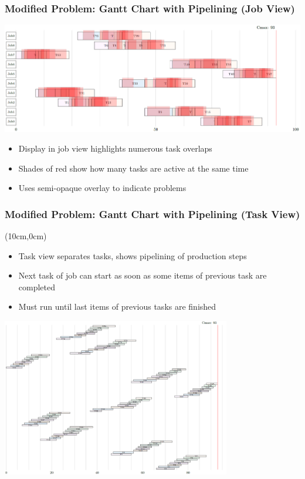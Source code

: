 \begin{frame}
  \frametitle{Modified Problem: Gantt Chart with Pipelining (Job View)}
  \includegraphics[width=13.5cm]{images/pipelinejobview}
  \begin{itemize}
      \item Display in job view highlights numerous task overlaps
      \item Shades of red show how many tasks are active at the same time
      \item Uses semi-opaque overlay to indicate problems
  \end{itemize}
\end{frame}

\begin{frame}
  \frametitle{Modified Problem: Gantt Chart with Pipelining (Task View)}
  \begin{textblock*}{5cm}(10cm,0cm)
  \begin{itemize}
      \item Task view separates tasks, shows pipelining of production steps
      \item Next task of job can start as soon as some items of previous task are completed 
      \item Must run until last items of previous tasks are finished
  \end{itemize}
  \end{textblock*}
  \includegraphics[width=10cm]{images/pipelinetaskview}
\end{frame}


